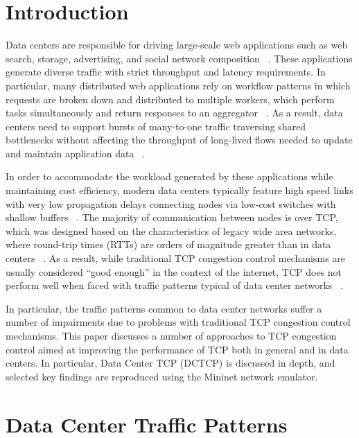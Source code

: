 \section{Introduction}

Data centers are responsible for driving large-scale web applications such as web search, storage, advertising, and social network composition ~\cite{chen_understanding_2009, alizadeh_data_2010}. These applications generate diverse traffic with strict throughput and latency requirements. In particular, many distributed web applications rely on workflow patterns in which requests are broken down and distributed to multiple workers, which perform tasks simultaneously and return responses to an aggregator ~\cite{chen_understanding_2009, alizadeh_data_2010}. As a result, data centers need to support bursts of many-to-one traffic traversing shared bottlenecks without affecting the throughput of long-lived flows needed to update and maintain application data ~\cite{alizadeh_data_2010}.

In order to accommodate the workload generated by these applications while maintaining cost efficiency, modern data centers typically feature high speed links with very low propagation delays connecting nodes via low-cost switches with shallow buffers ~\cite{chen_understanding_2009, hamilton_designing_2007, alizadeh_data_2010}. The majority of communication between nodes is over TCP, which was designed based on the characteristics of legacy wide area networks, where round-trip times (RTTs) are orders of magnitude greater than in data centers ~\cite{chen_understanding_2009}. As a result, while traditional TCP congestion control mechanisms are usually considered ``good enough'' in the context of the internet, TCP does not perform well when faced with traffic patterns typical of data center networks ~\cite{chen_understanding_2009, phanishayee_measurement_2008}. 

In particular, the traffic patterns common to data center networks suffer a number of impairments due to problems with traditional TCP congestion control mechanisms. This paper discusses a number of approaches to TCP congestion control aimed at improving the performance of TCP both in general and in data centers. In particular, Data Center TCP (DCTCP) is discussed in depth, and selected key findings are reproduced using the Mininet network emulator.

\section{Data Center Traffic Patterns}

